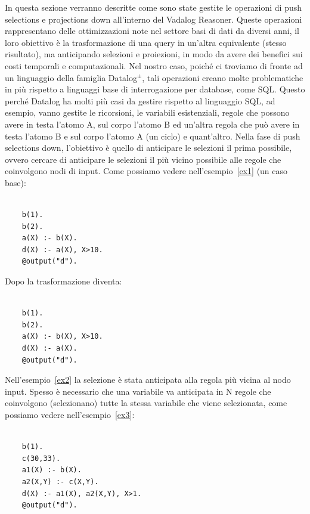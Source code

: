 In questa sezione verranno descritte come sono state gestite le operazioni di push selections e projections down all'interno del Vadalog Reasoner. \newline
Queste operazioni rappresentano delle ottimizzazioni note nel settore basi di dati da diversi anni, il loro obiettivo è la trasformazione di una query in un'altra equivalente (stesso risultato), ma anticipando selezioni e proiezioni, in modo da avere dei benefici sui costi temporali e computazionali. \newline
Nel nostro caso, poiché ci troviamo di fronte ad un linguaggio della famiglia Datalog$^\pm$, tali operazioni creano molte problematiche in più rispetto a linguaggi base di interrogazione per database, come SQL. \newline
Questo perché Datalog ha molti più casi da gestire rispetto al linguaggio SQL, ad esempio, vanno gestite le ricorsioni, le variabili esistenziali, regole che possono avere in testa l'atomo A, sul corpo l'atomo B ed un'altra regola che può avere in testa l'atomo B e sul corpo l'atomo A (un ciclo) e quant'altro. \newline \newline
Nella fase di push selections down, l'obiettivo è quello di anticipare le selezioni il prima possibile, ovvero cercare di anticipare le selezioni il più vicino possibile alle regole che coinvolgono nodi di input. Come possiamo vedere nell'esempio~\ref{ex1} (un caso base): 
\begin{example}\label{ex1}
\begin{lstlisting}
	
	b(1). 
	b(2). 
	a(X) :- b(X). 
	d(X) :- a(X), X>10. 
	@output("d").
\end{lstlisting}
\end{example}
Dopo la trasformazione diventa: 
\begin{example}\label{ex2}
	\begin{lstlisting}
	
	b(1). 
	b(2). 
	a(X) :- b(X), X>10. 
	d(X) :- a(X). 
	@output("d").
	\end{lstlisting}
\end{example}
Nell'esempio~\ref{ex2} la selezione è stata anticipata alla regola più vicina al nodo input. \newline
Spesso è necessario che una variabile va anticipata in N regole che coinvolgono (selezionano) tutte la stessa variabile che viene selezionata, come possiamo vedere nell'esempio~\ref{ex3}: 
\begin{example}\label{ex3}
	\begin{lstlisting}
	
	b(1). 
	c(30,33). 
	a1(X) :- b(X). 
	a2(X,Y) :- c(X,Y). 
	d(X) :- a1(X), a2(X,Y), X>1. 
	@output("d").
	\end{lstlisting}
\end{example}
